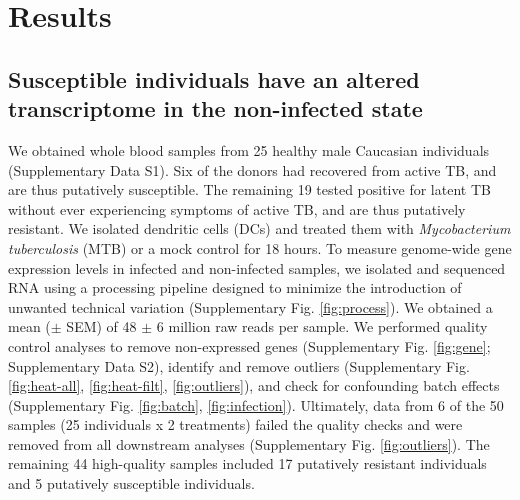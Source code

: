 \documentclass[fleqn,10pt]{wlscirep}
\begin{document}
\section*{Results}

\subsection*{Susceptible individuals have an altered transcriptome in the non-infected state}

We obtained whole blood samples from 25 healthy male Caucasian
individuals (Supplementary Data S1). Six of the donors had recovered
from active TB, and are thus putatively susceptible. The remaining 19
tested positive for latent TB without ever experiencing symptoms of
active TB, and are thus putatively resistant. We isolated dendritic
cells (DCs) and treated them with \emph{Mycobacterium
}\emph{tuberculosis} (MTB) or a mock control for 18 hours. To measure
genome-wide gene expression levels in infected and non-infected
samples, we isolated and sequenced RNA using a processing pipeline
designed to minimize the introduction of unwanted technical variation
(Supplementary Fig. \ref{fig:process}). We obtained a mean ($\pm$ SEM)
of 48 $\pm$ 6 million raw reads per sample. We performed quality
control analyses to remove non-expressed genes (Supplementary Fig.
\ref{fig:gene}; Supplementary Data S2), identify and remove outliers
(Supplementary Fig. \ref{fig:heat-all}, \ref{fig:heat-filt},
\ref{fig:outliers}), and check for confounding batch effects
(Supplementary Fig. \ref{fig:batch}, \ref{fig:infection}). Ultimately,
data from 6 of the 50 samples (25 individuals x 2 treatments) failed
the quality checks and were removed from all downstream analyses
(Supplementary Fig. \ref{fig:outliers}). The remaining 44 high-quality
samples included 17 putatively resistant individuals and 5 putatively
susceptible individuals.
\end{document}
